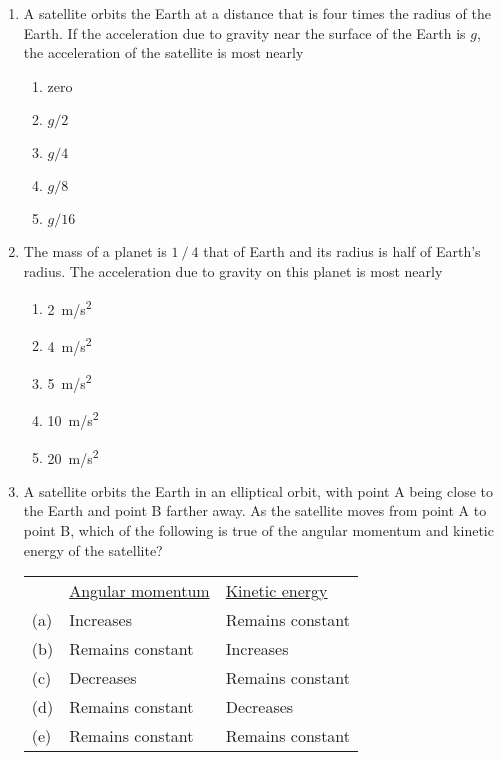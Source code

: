\documentclass[12pt]{article}
\begin{document}
\begin{enumerate}[leftmargin=50pt,label=\underline{\hspace{0.4in}} \arabic*.]
\item A satellite orbits the Earth at a distance that is four times the radius
  of the Earth. If the acceleration due to gravity near the surface of the Earth
  is $g$, the acceleration of the satellite is most nearly
  \begin{enumerate}[noitemsep,topsep=0pt,leftmargin=18pt]
  \item zero
  \item $g/2$
  \item $g/4$
  \item $g/8$
  \item $g/16$
  \end{enumerate}

\item The mass of a planet is $1⁄4$ that of Earth and its radius is half of
  Earth's radius. The acceleration due to gravity on this planet is most nearly
  \begin{enumerate}[noitemsep,topsep=0pt,leftmargin=18pt]
  \item\SI{2 }{m/s^2}
  \item\SI{4 }{m/s^2}
  \item\SI{5 }{m/s^2}
  \item\SI{10}{m/s^2}
  \item\SI{20}{m/s^2}
  \end{enumerate}
  \begin{center}
    \vspace{-.25in}
  \end{center}
  
\item A satellite orbits the Earth in an elliptical orbit, with point A being
  close to the Earth and point B farther away. As the satellite moves from
  point A to point B, which of the following is true of the angular momentum and
  kinetic energy of the satellite?
  
  \begin{tabular}{lll}
    & \underline{Angular momentum} & \underline{Kinetic energy}\\
    (a) & Increases & Remains constant \\
    (b) & Remains constant & Increases \\
    (c) & Decreases & Remains constant \\
    (d) & Remains constant & Decreases \\
    (e) & Remains constant & Remains constant
  \end{tabular}


\end{enumerate}
\end{document}
